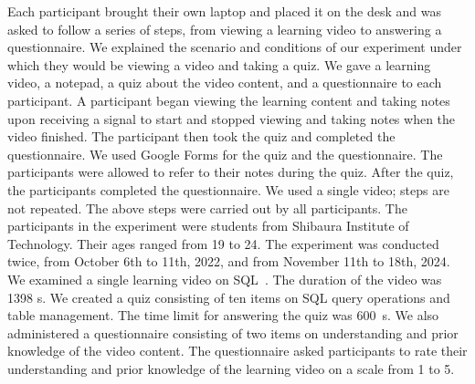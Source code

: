 \begin{deletedblock}
Each participant brought their own laptop and placed it on the desk and was asked to follow a series of steps, from viewing a learning video to answering a questionnaire.
We explained the scenario and conditions of our experiment under which they would be viewing a video and taking a quiz.
We gave a learning video, a notepad, a quiz about the video content, and a questionnaire to each participant.
A participant began viewing the learning content and taking notes upon receiving a signal to start and stopped viewing and taking notes when the video finished.
The participant then took the quiz and completed the questionnaire.
We used Google Forms for the quiz and the questionnaire.
The participants were allowed to refer to their notes during the quiz.
After the quiz, the participants completed the questionnaire.
We used a single video; steps are not repeated.
The above steps were carried out by all participants.
The participants in the experiment were students from Shibaura Institute of Technology.
Their ages ranged from 19 to 24.
The experiment was conducted twice, from October 6th to 11th, 2022, and from November 11th to 18th, 2024.
We examined a single learning video on SQL~\cite{SQL}.
The duration of the video was 1398 s.
We created a quiz consisting of ten items on SQL query operations and table management.
The time limit for answering the quiz was 600~s.
We also administered a questionnaire consisting of two items on understanding and prior knowledge of the video content.
The questionnaire asked participants to rate their understanding and prior knowledge of the learning video on a scale from 1 to 5.
\end{deletedblock}
